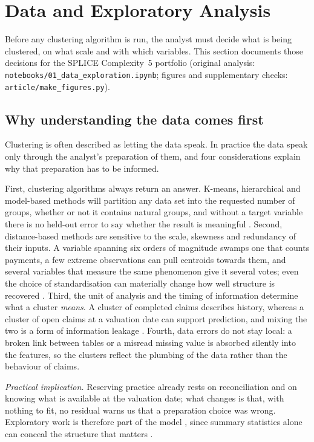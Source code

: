 \section{Data and Exploratory Analysis}
\label{data}

Before any clustering algorithm is run, the analyst must decide what is being clustered, on what scale and with which variables. This section documents those decisions for the SPLICE Complexity~5 portfolio (original analysis: \texttt{notebooks/01\_data\_exploration.ipynb}; figures and supplementary checks: \texttt{article/make\_figures.py}).

\subsection{Why understanding the data comes first}
\label{sec:why}

Clustering is often described as letting the data speak. In practice the data speak only through the analyst's preparation of them, and four considerations explain why that preparation has to be informed.

First, clustering algorithms always return an answer. K-means, hierarchical and model-based methods will partition any data set into the requested number of groups, whether or not it contains natural groups, and without a target variable there is no held-out error to say whether the result is meaningful \parencite{jain2010data}. Second, distance-based methods are sensitive to the scale, skewness and redundancy of their inputs. A variable spanning six orders of magnitude swamps one that counts payments, a few extreme observations can pull centroids towards them, and several variables that measure the same phenomenon give it several votes; even the choice of standardisation can materially change how well structure is recovered \parencite{milligan1988study,hastie2009elements}. Third, the unit of analysis and the timing of information determine what a cluster \emph{means}. A cluster of completed claims describes history, whereas a cluster of open claims at a valuation date can support prediction, and mixing the two is a form of information leakage \parencite{kaufman2012leakage}. Fourth, data errors do not stay local: a broken link between tables or a misread missing value is absorbed silently into the features, so the clusters reflect the plumbing of the data rather than the behaviour of claims.

\emph{Practical implication.} Reserving practice already rests on reconciliation and on knowing what is available at the valuation date; what changes is that, with nothing to fit, no residual warns us that a preparation choice was wrong. Exploratory work is therefore part of the model \parencite{tukey1977exploratory}, since summary statistics alone can conceal the structure that matters \parencite{anscombe1973graphs}.

